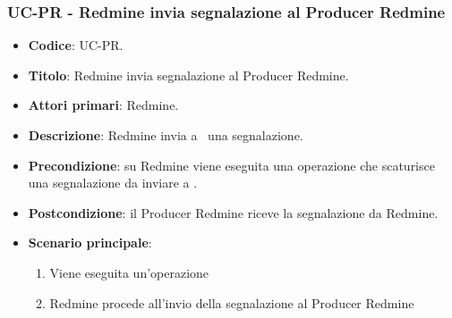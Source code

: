 \subsubsection{UC\theuccount-PR - Redmine invia segnalazione al Producer Redmine}
	\begin{itemize}
		\item \textbf{Codice}: UC\theuccount-PR.
		\item \textbf{Titolo}: Redmine invia segnalazione al Producer Redmine.
		\item \textbf{Attori primari}: Redmine.
		\item \textbf{Descrizione}: Redmine invia a \progetto\ una segnalazione.
		\item \textbf{Precondizione}: su Redmine viene eseguita una operazione che scaturisce una
		segnalazione da inviare a \progetto.
		\item \textbf{Postcondizione}: il Producer Redmine riceve la segnalazione da Redmine.
		\item \textbf{Scenario principale}: 
		\begin{enumerate}
			\item Viene eseguita un'operazione
			\item Redmine procede all'invio della segnalazione al Producer Redmine
		\end{enumerate}
		
	\end{itemize}

	
